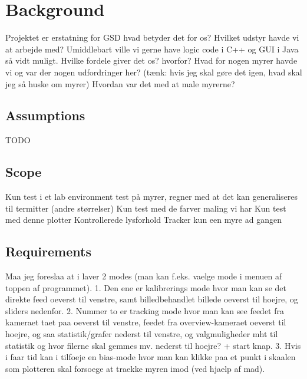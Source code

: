 
\section{Background}

Projektet er erstatning for GSD hvad betyder det for os?
Hvilket udstyr havde vi at arbejde med?
Umiddlebart ville vi gerne have logic code i C++ og GUI i Java så vidt muligt. Hvilke fordele giver det os? hvorfor?
Hvad for nogen myrer havde vi og var der nogen udfordringer her? (tænk: hvis jeg skal gøre det igen, hvad skal jeg så huske om myrer)
Hvordan var det med at male myrerne?

\subsection{Assumptions}

TODO

\subsection{Scope}

Kun test i et lab environment
test på myrer, regner med at det kan generaliseres til termitter (andre størrelser)
Kun test med de farver maling vi har
Kun test med denne plotter
Kontrollerede lysforhold
Tracker kun een myre ad gangen

\subsection{Requirements}

Maa jeg foreslaa at i laver 2 modes (man kan f.eks. vaelge mode i menuen
af toppen af programmet).
1. Den ene er kalibrerings mode hvor man kan se det direkte feed oeverst
til venstre, samt billedbehandlet billede oeverst til hoejre, og sliders
nedenfor.
2. Nummer to er tracking mode hvor man kan see feedet fra kameraet taet
paa oeverst til venstre, feedet fra overview-kameraet oeverst til hoejre,
og saa statistik/grafer nederst til venstre, og valgmuligheder mht til
statistik og hvor filerne skal gemmes mv. nederst til hoejre? + start
knap.
3. Hvis i faar tid kan i tilfoeje en bias-mode hvor man kan klikke paa et
punkt i skaalen som plotteren skal forsoege at traekke myren imod (ved
hjaelp af mad).

